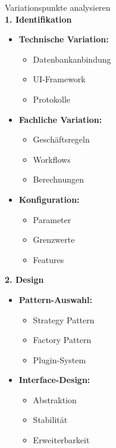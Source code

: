 \begin{KR}{Variationspunkte analysieren}\\
\textbf{1. Identifikation}
\begin{itemize}
    \item \textbf{Technische Variation:}
    \begin{itemize}
        \item Datenbankanbindung
        \item UI-Framework
        \item Protokolle
    \end{itemize}
    
    \item \textbf{Fachliche Variation:}
    \begin{itemize}
        \item Geschäftsregeln
        \item Workflows
        \item Berechnungen
    \end{itemize}
    
    \item \textbf{Konfiguration:}
    \begin{itemize}
        \item Parameter
        \item Grenzwerte
        \item Features
    \end{itemize}
\end{itemize}

\textbf{2. Design}
\begin{itemize}
    \item \textbf{Pattern-Auswahl:}
    \begin{itemize}
        \item Strategy Pattern
        \item Factory Pattern
        \item Plugin-System
    \end{itemize}
    
    \item \textbf{Interface-Design:}
    \begin{itemize}
        \item Abstraktion
        \item Stabilität
        \item Erweiterbarkeit
    \end{itemize}
\end{itemize}
\end{KR}

